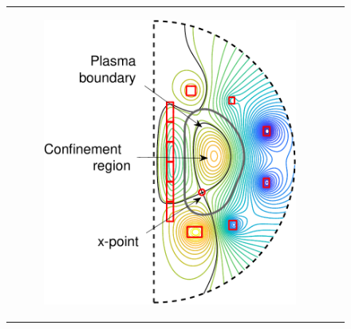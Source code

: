 \documentclass{beamer}
\begin{document}
\begin{frame}[t]
\begin{minipage}[t]{\linewidth}
\begin{columns}
        \begin{column}{0.5\linewidth}
        \vspace{-6mm}
            \begin{figure}[H]	
                \centering
                \hspace{-17mm}
                \begin{tabular}{cc}
                    \begin{subfigure}{0.5\textwidth}
                    \includegraphics[height=1.8\linewidth]{./figures_slides/FreeBoundary_contoursWstructures}
                    \end{subfigure}
                \end{tabular}
            \end{figure}
        \end{column}
    \end{columns}
\end{minipage}
\end{frame}
\end{document}

